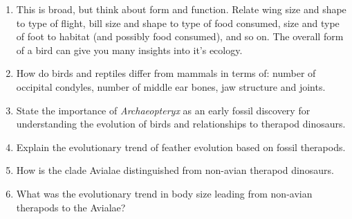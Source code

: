 \documentclass[nofonts, letterpaper]{tufte-handout}
\begin{document}
\begin{enumerate}

\item This is broad, but think about form and function. Relate wing size and shape to type of flight, bill size and shape to type of food consumed, size and type of foot to habitat (and possibly food consumed), and so on. The overall form of a bird can give you many insights into it's ecology.

\item How do birds and reptiles differ from mammals in terms of: number of occipital condyles, number of middle ear bones, jaw structure and joints.

\item State the importance of \textit{Archaeopteryx} as an early fossil discovery for understanding the evolution of birds and relationships to therapod dinosaurs.

\item Explain the evolutionary trend of feather evolution based on fossil therapods. 

\item How is the clade Avialae distinguished from non-avian therapod dinosaurs.

\item What was the evolutionary trend in body size leading from non-avian therapods to the Avialae?

\end{enumerate}
\end{document}
